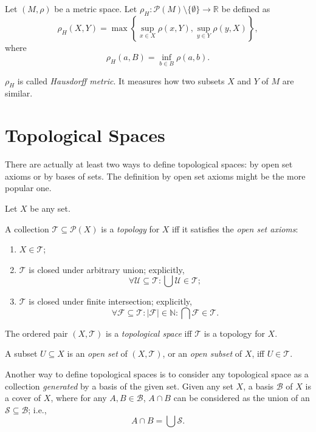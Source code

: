 \documentclass{report}
\begin{document}
\begin{example}
	Let $(M, \rho)$ be a metric space. Let $\rho_H: \mathcal P(M) \setminus \{\emptyset\} \to \mathbb R$ be defined as
	$$
	\rho_H(X, Y) = \max \left\{ \sup_{x \in X} \rho(x, Y), \sup_{y \in Y} \rho (y, X) \right\},
	$$
	where
	$$
	\rho_H(a, B) = \inf_{b \in B} \rho(a,b).
	$$
	
	$\rho_H$ is called \textit{Hausdorff metric}. It measures how two subsets $X$ and $Y$ of $M$ are similar.
\end{example}



\section{Topological Spaces}

There are actually at least two ways to define topological spaces: by open set axioms or by bases of sets. The definition by open set axioms might be the more popular one.

\begin{definition}
	\label{def: topology}
	
	Let $X$ be any set.
	
	A collection $\mathcal T \subseteq \mathcal P(X)$ is a \textit{topology} for $X$ iff it satisfies the \textit{open set axioms}:
	\begin{enumerate}[(O1):]
		\item
		$X \in \mathcal T$;
		
		\item
		$\mathcal T$ is closed under arbitrary union; explicitly,
		$$
		\forall \mathcal U \subseteq \mathcal T: \bigcup \mathcal U \in \mathcal T;
		$$
		
		\item
		$\mathcal T$ is closed under finite intersection; explicitly,
		$$
		\forall \mathcal F \subseteq \mathcal T : |\mathcal F| \in \mathbb N : \bigcap \mathcal F \in \mathcal T.
		$$
	\end{enumerate}
	
	The ordered pair $(X, \mathcal T)$ is a \textit{topological space} iff $\mathcal T$ is a topology for $X$.
		
	A subset $U \subseteq X$ is an \textit{open set} of $(X, \mathcal T)$, or an \textit{open subset} of $X$, iff $U \in \mathcal T$.
\end{definition}


Another way to define topological spaces is to consider any topological space as a collection \textit{generated} by a basis of the given set. Given any set $X$, a basis $\mathcal B$ of $X$ is a cover of $X$, where for any $A, B \in \mathcal B$, $A \cap B$ can be considered as the union of an $\mathcal S \subseteq \mathcal B$; i.e.,
$$
A \cap B = \bigcup \mathcal S.
$$
\end{document}
